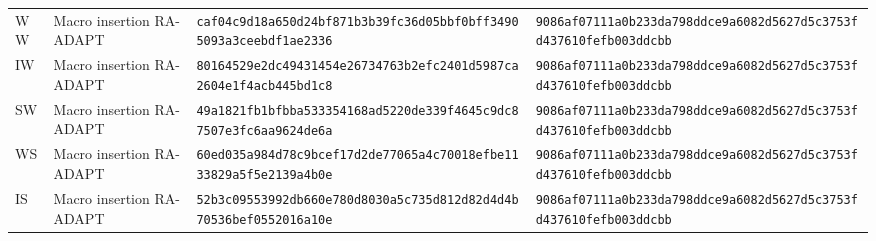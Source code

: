 \documentclass[10pt,letterpaper]{article}
\begin{document}
\begin{longtable}{@{}llp{2.55in}p{2.55in}@{}}
WW & Macro insertion RA-ADAPT & \texttt{caf04c9d}\allowbreak{}\texttt{18a650d2}\allowbreak{}\texttt{4bf871b3}\allowbreak{}\texttt{b39fc36d}\allowbreak{}\texttt{05bbf0bf}\allowbreak{}\texttt{f3490509}\allowbreak{}\texttt{3a3ceebd}\allowbreak{}\texttt{f1ae2336}\allowbreak{} & \texttt{9086af07}\allowbreak{}\texttt{111a0b23}\allowbreak{}\texttt{3da798dd}\allowbreak{}\texttt{ce9a6082}\allowbreak{}\texttt{d5627d5c}\allowbreak{}\texttt{3753fd43}\allowbreak{}\texttt{7610fefb}\allowbreak{}\texttt{003ddcbb}\allowbreak{} \\
IW & Macro insertion RA-ADAPT & \texttt{80164529}\allowbreak{}\texttt{e2dc4943}\allowbreak{}\texttt{1454e267}\allowbreak{}\texttt{34763b2e}\allowbreak{}\texttt{fc2401d5}\allowbreak{}\texttt{987ca260}\allowbreak{}\texttt{4e1f4acb}\allowbreak{}\texttt{445bd1c8}\allowbreak{} & \texttt{9086af07}\allowbreak{}\texttt{111a0b23}\allowbreak{}\texttt{3da798dd}\allowbreak{}\texttt{ce9a6082}\allowbreak{}\texttt{d5627d5c}\allowbreak{}\texttt{3753fd43}\allowbreak{}\texttt{7610fefb}\allowbreak{}\texttt{003ddcbb}\allowbreak{} \\
SW & Macro insertion RA-ADAPT & \texttt{49a1821f}\allowbreak{}\texttt{b1bfbba5}\allowbreak{}\texttt{33354168}\allowbreak{}\texttt{ad5220de}\allowbreak{}\texttt{339f4645}\allowbreak{}\texttt{c9dc8750}\allowbreak{}\texttt{7e3fc6aa}\allowbreak{}\texttt{9624de6a}\allowbreak{} & \texttt{9086af07}\allowbreak{}\texttt{111a0b23}\allowbreak{}\texttt{3da798dd}\allowbreak{}\texttt{ce9a6082}\allowbreak{}\texttt{d5627d5c}\allowbreak{}\texttt{3753fd43}\allowbreak{}\texttt{7610fefb}\allowbreak{}\texttt{003ddcbb}\allowbreak{} \\
WS & Macro insertion RA-ADAPT & \texttt{60ed035a}\allowbreak{}\texttt{984d78c9}\allowbreak{}\texttt{bcef17d2}\allowbreak{}\texttt{de77065a}\allowbreak{}\texttt{4c70018e}\allowbreak{}\texttt{fbe11338}\allowbreak{}\texttt{29a5f5e2}\allowbreak{}\texttt{139a4b0e}\allowbreak{} & \texttt{9086af07}\allowbreak{}\texttt{111a0b23}\allowbreak{}\texttt{3da798dd}\allowbreak{}\texttt{ce9a6082}\allowbreak{}\texttt{d5627d5c}\allowbreak{}\texttt{3753fd43}\allowbreak{}\texttt{7610fefb}\allowbreak{}\texttt{003ddcbb}\allowbreak{} \\
IS & Macro insertion RA-ADAPT & \texttt{52b3c095}\allowbreak{}\texttt{53992db6}\allowbreak{}\texttt{60e780d8}\allowbreak{}\texttt{030a5c73}\allowbreak{}\texttt{5d812d82}\allowbreak{}\texttt{d4d4b705}\allowbreak{}\texttt{36bef055}\allowbreak{}\texttt{2016a10e}\allowbreak{} & \texttt{9086af07}\allowbreak{}\texttt{111a0b23}\allowbreak{}\texttt{3da798dd}\allowbreak{}\texttt{ce9a6082}\allowbreak{}\texttt{d5627d5c}\allowbreak{}\texttt{3753fd43}\allowbreak{}\texttt{7610fefb}\allowbreak{}\texttt{003ddcbb}\allowbreak{} \\

\end{longtable}
\end{document}
